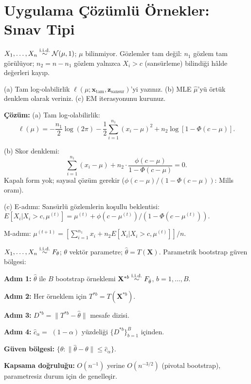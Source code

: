\section{Uygulama Çözümlü Örnekler: Sınav Tipi}
\label{app:sinav_tipi}

\begin{ornek}
$X_1,\ldots,X_n\overset{\text{i.i.d.}}{\sim}\mathcal{N}(\mu,1)$; $\mu$ bilinmiyor. Gözlemler tam değil: $n_1$ gözlem tam görülüyor; $n_2=n-n_1$ gözlem yalnızca $X_i>c$ (sansürleme) bilindiği hâlde değerleri kayıp.

(a) Tam log-olabilirlik $\ell(\mu;\mathbf{x}_{\mathrm{tam}},\mathbf{z}_{\mathrm{sansur}})$'yi yazınız.
(b) MLE $\hat\mu$'yü örtük denklem olarak veriniz.
(c) EM iterasyonunu kurunuz.

\textbf{Çözüm:}
(a) Tam log-olabilirlik:
\[
  \ell(\mu) = -\frac{n_1}{2}\log(2\pi)-\frac{1}{2}\sum_{i=1}^{n_1}(x_i-\mu)^2 + n_2\log[1-\Phi(c-\mu)].
\]

(b) Skor denklemi:
\[
  \sum_{i=1}^{n_1}(x_i-\mu) + n_2\cdot\frac{\phi(c-\mu)}{1-\Phi(c-\mu)} = 0.
\]
Kapalı form yok; sayısal çözüm gerekir ($\phi(c-\mu)/(1-\Phi(c-\mu))$: Mills oranı).

(c) E-adımı: Sansürlü gözlemlerin koşullu beklentisi:
$E[X_i|X_i>c,\mu^{(t)}]=\mu^{(t)}+\phi(c-\mu^{(t)})/(1-\Phi(c-\mu^{(t)}))$.

M-adımı: $\mu^{(t+1)}=[{\sum}_{i=1}^{n_1}x_i + n_2 E[X_i|X_i>c,\mu^{(t)}]]/n$.
\end{ornek}

\begin{ornek}
$X_1,\ldots,X_n\overset{\text{i.i.d.}}{\sim} F_\theta$; $\theta$ vektör parametre; $\hat\theta=T(\mathbf{X})$.
Parametrik bootstrap güven bölgesi:

\textbf{Adım 1:} $\hat\theta$ ile $B$ bootstrap örneklemi $\mathbf{X}^{*b}\overset{\text{i.i.d.}}{\sim} F_{\hat\theta}$, $b=1,\ldots,B$.

\textbf{Adım 2:} Her örneklem için $T^{*b}=T(\mathbf{X}^{*b})$.

\textbf{Adım 3:} $D^{*b}=\|T^{*b}-\hat\theta\|$ mesafe dizisi.

\textbf{Adım 4:} $\hat c_\alpha=$ $(1-\alpha)$ yüzdeliği $\{D^{*b}\}_{b=1}^B$ içinden.

\textbf{Güven bölgesi:} $\{\theta:\|\hat\theta-\theta\|\leq\hat c_\alpha\}$.

\textbf{Kapsama doğruluğu:} $O(n^{-1})$ yerine $O(n^{-3/2})$ (pivotal bootstrap), parametresiz durum için de genelleşir.
\end{ornek}

